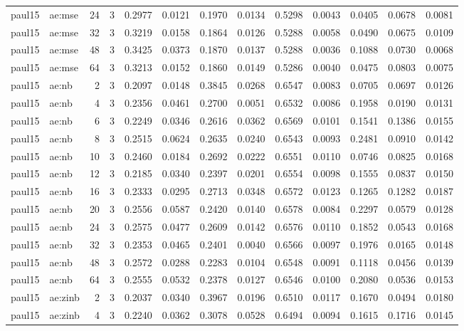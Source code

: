 \begin{tabular}{llrrrrrrrrrrr}
paul15 & ae:mse & 24 & 3 & 0.2977 & 0.0121 & 0.1970 & 0.0134 & 0.5298 & 0.0043 & 0.0405 & 0.0678 & 0.0081 \\
paul15 & ae:mse & 32 & 3 & 0.3219 & 0.0158 & 0.1864 & 0.0126 & 0.5288 & 0.0058 & 0.0490 & 0.0675 & 0.0109 \\
paul15 & ae:mse & 48 & 3 & 0.3425 & 0.0373 & 0.1870 & 0.0137 & 0.5288 & 0.0036 & 0.1088 & 0.0730 & 0.0068 \\
paul15 & ae:mse & 64 & 3 & 0.3213 & 0.0152 & 0.1860 & 0.0149 & 0.5286 & 0.0040 & 0.0475 & 0.0803 & 0.0075 \\
paul15 & ae:nb & 2 & 3 & 0.2097 & 0.0148 & 0.3845 & 0.0268 & 0.6547 & 0.0083 & 0.0705 & 0.0697 & 0.0126 \\
paul15 & ae:nb & 4 & 3 & 0.2356 & 0.0461 & 0.2700 & 0.0051 & 0.6532 & 0.0086 & 0.1958 & 0.0190 & 0.0131 \\
paul15 & ae:nb & 6 & 3 & 0.2249 & 0.0346 & 0.2616 & 0.0362 & 0.6569 & 0.0101 & 0.1541 & 0.1386 & 0.0155 \\
paul15 & ae:nb & 8 & 3 & 0.2515 & 0.0624 & 0.2635 & 0.0240 & 0.6543 & 0.0093 & 0.2481 & 0.0910 & 0.0142 \\
paul15 & ae:nb & 10 & 3 & 0.2460 & 0.0184 & 0.2692 & 0.0222 & 0.6551 & 0.0110 & 0.0746 & 0.0825 & 0.0168 \\
paul15 & ae:nb & 12 & 3 & 0.2185 & 0.0340 & 0.2397 & 0.0201 & 0.6554 & 0.0098 & 0.1555 & 0.0837 & 0.0150 \\
paul15 & ae:nb & 16 & 3 & 0.2333 & 0.0295 & 0.2713 & 0.0348 & 0.6572 & 0.0123 & 0.1265 & 0.1282 & 0.0187 \\
paul15 & ae:nb & 20 & 3 & 0.2556 & 0.0587 & 0.2420 & 0.0140 & 0.6578 & 0.0084 & 0.2297 & 0.0579 & 0.0128 \\
paul15 & ae:nb & 24 & 3 & 0.2575 & 0.0477 & 0.2609 & 0.0142 & 0.6576 & 0.0110 & 0.1852 & 0.0543 & 0.0168 \\
paul15 & ae:nb & 32 & 3 & 0.2353 & 0.0465 & 0.2401 & 0.0040 & 0.6566 & 0.0097 & 0.1976 & 0.0165 & 0.0148 \\
paul15 & ae:nb & 48 & 3 & 0.2572 & 0.0288 & 0.2283 & 0.0104 & 0.6548 & 0.0091 & 0.1118 & 0.0456 & 0.0139 \\
paul15 & ae:nb & 64 & 3 & 0.2555 & 0.0532 & 0.2378 & 0.0127 & 0.6546 & 0.0100 & 0.2080 & 0.0536 & 0.0153 \\
paul15 & ae:zinb & 2 & 3 & 0.2037 & 0.0340 & 0.3967 & 0.0196 & 0.6510 & 0.0117 & 0.1670 & 0.0494 & 0.0180 \\
paul15 & ae:zinb & 4 & 3 & 0.2240 & 0.0362 & 0.3078 & 0.0528 & 0.6494 & 0.0094 & 0.1615 & 0.1716 & 0.0145 \\

\end{tabular}
